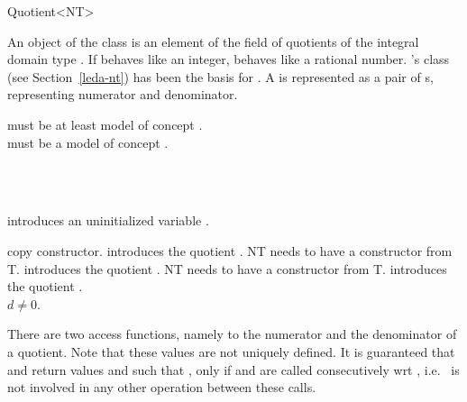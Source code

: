 
\begin{ccRefClass} {Quotient<NT>}
\label{Quotient}

\ccDefinition
An object of the class  is an element of the 
field of quotients of the integral domain type .
If  behaves like an integer, 
behaves like a rational number. 
{\leda}'s class  (see Section~\ref{leda-nt})
has been the basis for .
A   is represented as a pair of 
s, representing numerator and denominator.

 must be at least model of concept .\\
 must be a model of concept . \\



\ccIsModel

\\
\\

\ccCreation
{}

             {introduces an uninitialized variable \ccVar.}

\ccHidden {}
 	    {copy constructor.}
\ccGlue
{}
{introduces the quotient . NT needs to have a constructor from T.}
\ccGlue
{}
{introduces the quotient .
NT needs to have a constructor from T.}
\ccGlue
{}
            {introduces the quotient .\\
            \ccPrecond $d \neq 0$.         }


\ccOperations


There are two access functions, namely to the
numerator and the denominator of a quotient.
Note that these values are not uniquely defined. 
It is guaranteed that  and 
 return values  and
 such that , only
if   and  are called
consecutively wrt , i.e.~ is not involved in 
any other operation between these calls.


\end{ccRefClass}
